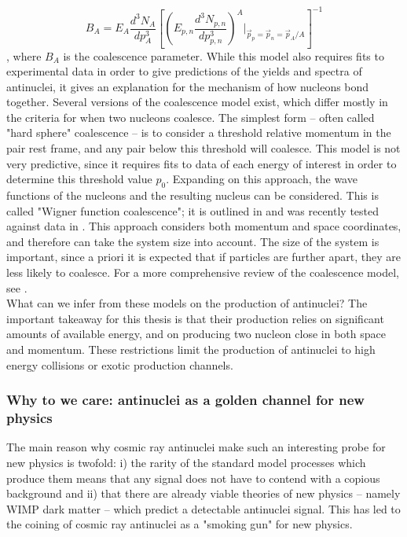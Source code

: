 \begin{equation}\label{eq:CoalescenceParameter}
    B_A = E_A \frac{d^3 N_A}{dp^3_A} \left[ \left( E_{p,n} \frac{d^3 N_{p,n}}{dp^3_{p,n}} \right)^A |_{\vec{p}_p=\vec{p}_n=\vec{p}_A/A } \right]^{-1}
\end{equation}
, where $B_A$ is the coalescence parameter. While this model also requires fits to experimental data in order to give predictions of the yields and spectra of antinuclei, it gives an explanation for the mechanism of how nucleons bond together. Several versions of the coalescence model exist, which differ mostly in the criteria for when two nucleons coalesce. The simplest form -- often called "hard sphere" coalescence -- is to consider a threshold relative momentum in the pair rest frame, and any pair below this threshold will coalesce. This model is not very predictive, since it requires fits to data of each energy of interest in order to determine this threshold value $p_0$. Expanding on this approach, the wave functions of the nucleons and the resulting nucleus can be considered. This is called "Wigner function coalescence"; it is outlined in \cite{Kachelriess:2019taq, Blum_2019} and was recently tested against data in \cite{ALICE_coalescence_Luca}. This approach considers both momentum and space coordinates, and therefore can take the system size into account. The size of the system is important, since a priori it is expected that if particles are further apart, they are less likely to coalesce. For a more comprehensive review of the coalescence model, see \cite{Kachelriess:2020uoh, Coalescence2015}.\\

What can we infer from these models on the production of antinuclei? The important takeaway for this thesis is that their production relies on significant amounts of available energy, and on producing two nucleon close in both space and momentum. These restrictions limit the production of antinuclei to high energy collisions or exotic production channels.

\subsubsection{ Why to we care: antinuclei as a golden channel for new physics}\label{sec:Intro:AntinucleiGoldenChannel}
The main reason why cosmic ray antinuclei make such an interesting probe for new physics is twofold: i) the rarity of the standard model processes which produce them means that any signal does not have to contend with a copious background and ii) that there are already viable theories of new physics -- namely WIMP dark matter -- which predict a detectable antinuclei signal. This has led to the coining of cosmic ray antinuclei as a "smoking gun" for new physics. \\


